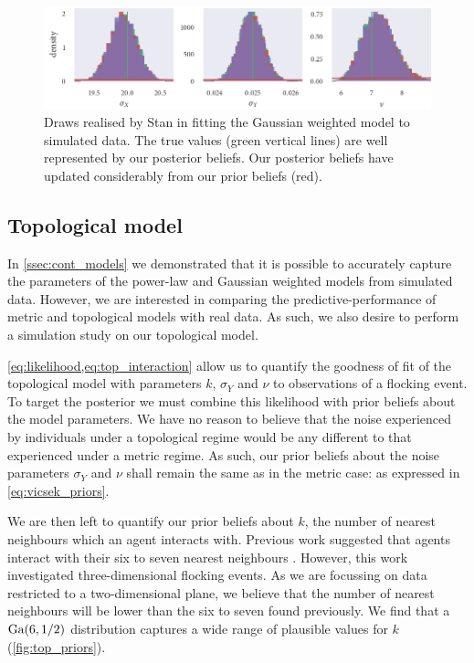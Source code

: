 \begin{figure}[tbp]
  \includegraphics{gauss_hist.pdf}
  \caption{Draws realised by Stan in fitting the Gaussian weighted model to simulated
    data. The true values (green vertical lines) are well represented by our posterior
    beliefs. Our posterior beliefs have updated considerably from our prior beliefs
    (red).}
  \label{fig:gauss_sim_study_hists}
\end{figure}

\subsection{Topological model}

In \cref{ssec:cont_models} we demonstrated that it is possible to accurately capture the
parameters of the power-law and Gaussian weighted models from simulated data. However, we
are interested in comparing the predictive-performance of metric and topological models
with real data. As such, we also desire to perform a simulation study on our topological
model.

\cref{eq:likelihood,eq:top_interaction} allow us to quantify the goodness of fit of the
topological model with parameters $k$, $\sigma_Y$ and $\nu$ to observations of a flocking
event. To target the posterior we must combine this likelihood with prior beliefs about
the model parameters. We have no reason to believe that the noise experienced by
individuals under a topological regime would be any different to that experienced under a
metric regime. As such, our prior beliefs about the noise parameters $\sigma_Y$ and $\nu$
shall remain the same as in the metric case: as expressed in \cref{eq:vicsek_priors}.

We are then left to quantify our prior beliefs about $k$, the number of nearest neighbours
which an agent interacts with. Previous work suggested that agents interact with their six
to seven nearest neighbours \parencite{ballerini08}. However, this work investigated
three-dimensional flocking events. As we are focussing on data restricted to a
two-dimensional plane, we believe that the number of nearest neighbours will be lower than
the six to seven found previously. We find that a $\textrm{Ga}(6, 1/2)$ distribution captures a
wide range of plausible values for $k$ (\cref{fig:top_priors}).

